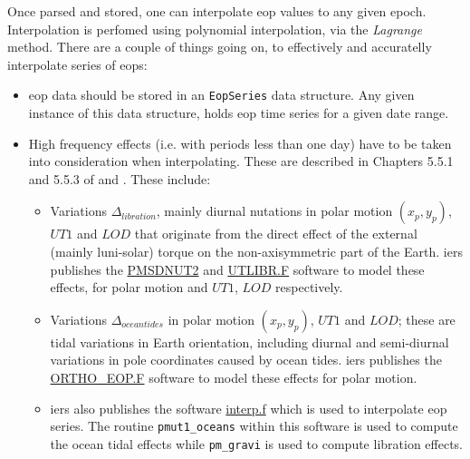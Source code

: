 Once parsed and stored, one can interpolate \gls{eop} values to any given epoch. 
Interpolation is perfomed using polynomial interpolation, via the \emph{Lagrange} method. 
There are a couple of things going on, to effectively and accuratelly interpolate 
series of \glspl{eop}:
\begin{itemize}
  \item \gls{eop} data should be stored in an \texttt{EopSeries} data structure. 
    Any given instance of this data structure, holds \gls{eop} time series for 
    a given date range.
  \item High frequency effects (i.e. with periods less than one day) have to be 
    taken into consideration when interpolating. These are described in Chapters 
    5.5.1 and 5.5.3 of \cite{iers2010} and \cite{Bradley2016}. These include:
    
    \begin{itemize}
      \item Variations $\Delta _{libration}$, mainly diurnal nutations in 
        polar motion $(x_p, y_p)$, $UT1$ and $LOD$ that originate from the direct 
        effect of the external (mainly luni-solar) torque on the non-axisymmetric 
        part of the Earth. \gls{iers} publishes the 
        \href{https://iers-conventions.obspm.fr/content/chapter5/software/PMSDNUT2.F}{PMSDNUT2} 
        and \href{https://iers-conventions.obspm.fr/content/chapter5/software/UTLIBR.F}{UTLIBR.F} 
        software to model these effects, for polar motion and $UT1$, $LOD$ respectively. 

      \item Variations $\Delta _{ocean tides}$ in polar motion $(x_p, y_p)$, $UT1$ and $LOD$; 
        these are tidal variations in Earth orientation, including diurnal and semi-diurnal 
        variations in pole coordinates caused by ocean tides. \gls{iers} publishes the 
        \href{https://iers-conventions.obspm.fr/content/chapter8/software/ORTHO_EOP.F}{ORTHO\_EOP.F} 
        software to model these effects for polar motion.
        
      \item \gls{iers} also publishes the software 
       \href{https://hpiers.obspm.fr/iers/models/interp.f}{interp.f} 
        which is used to interpolate \gls{eop} series. The routine \texttt{pmut1\_oceans} 
        within this software is used to compute the ocean tidal effects while 
        \texttt{pm\_gravi} is used to compute libration effects.


\end{itemize}
\end{itemize}
